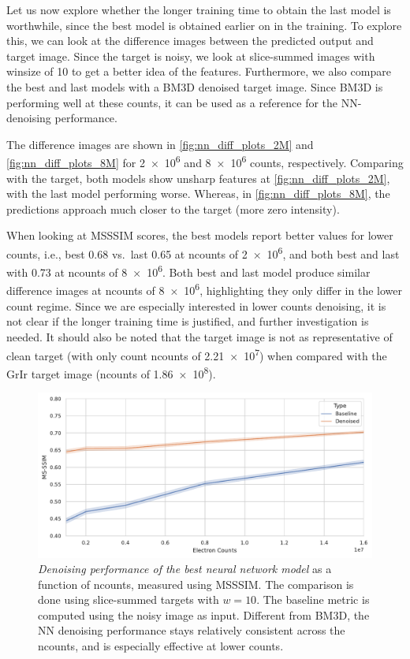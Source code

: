Let us now explore whether the longer training time to obtain the last model is worthwhile, since the best model is obtained earlier on in the training. To explore this,  we can look at the difference images between the predicted output and target image. Since the target is noisy, we look at slice-summed images with \gls{winsize} of \num{10} to get a better idea of the features. Furthermore, we also compare the best and last models with a BM3D denoised target image. Since BM3D is performing well at these counts, it can be used as a reference for the \gls{NN}-denoising performance.

The difference images are shown in \cref{fig:nn_diff_plots_2M} and \cref{fig:nn_diff_plots_8M} for \num{2e6} and \num{8e6} counts, respectively. Comparing with the target, both models show unsharp features at \cref{fig:nn_diff_plots_2M}, with the last model performing worse. Whereas, in \cref{fig:nn_diff_plots_8M}, the predictions approach much closer to the target (more zero intensity).

When looking at \gls{MSSSIM} scores, the best models report better values for lower counts, i.e., best \num{0.68} vs.\ last \num{0.65} at \gls{ncounts} of \num{2e6}, and both best and last with \num{0.73} at \gls{ncounts} of \num{8e6}. Both best and last model produce similar difference images at \gls{ncounts} of \num{8e6}, highlighting they only differ in the lower count regime. Since we are especially interested in lower counts denoising, it is not clear if the longer training time is justified, and further investigation is needed. It should also be noted that the target image is not as representative of clean target (with only count \gls{ncounts} of \num{2.21e7}) when compared with the \gls{GrIr} target image (\gls{ncounts} of \num{1.86e8}).

\begin{figure}
    \centering
    \includegraphics[width=1\linewidth]{images/nn_gdw_msssim.pdf}
    \caption{\textit{Denoising performance of the best neural network model} as a function of \gls{ncounts}, measured using \gls{MSSSIM}. The comparison is done using slice-summed targets with $w=10$. The baseline metric is computed using the noisy image as input. Different from \gls{BM3D}, the \gls{NN} denoising performance stays relatively consistent across the \gls{ncounts}, and is especially effective at lower counts.}
    \label{fig:gdw-test-metirc}
\end{figure}


